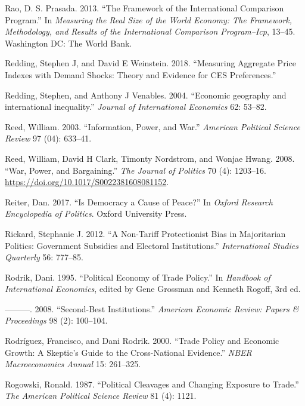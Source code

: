 \documentclass{puthesis}
\newlength{\cslhangindent}
\newenvironment{cslreferences}%
  {\setlength{\parindent}{0pt}%
  \everypar{\setlength{\hangindent}{\cslhangindent}}\ignorespaces}%
  {\par}
\begin{document}
\begin{cslreferences}
\leavevmode\hypertarget{ref-Rao2013}{}%
Rao, D. S. Prasada. 2013. ``The Framework of the International
Comparison Program.'' In \emph{Measuring the Real Size of the World
Economy: The Framework, Methodology, and Results of the International
Comparison Program--Icp}, 13--45. Washington DC: The World Bank.

\leavevmode\hypertarget{ref-Redding2018}{}%
Redding, Stephen J, and David E Weinstein. 2018. ``Measuring Aggregate
Price Indexes with Demand Shocks: Theory and Evidence for CES
Preferences.''

\leavevmode\hypertarget{ref-Redding2004}{}%
Redding, Stephen, and Anthony J Venables. 2004. ``Economic geography and
international inequality.'' \emph{Journal of International Economics}
62: 53--82.

\leavevmode\hypertarget{ref-Reed2003}{}%
Reed, William. 2003. ``Information, Power, and War.'' \emph{American
Political Science Review} 97 (04): 633--41.

\leavevmode\hypertarget{ref-Reed2008}{}%
Reed, William, David H Clark, Timonty Nordstrom, and Wonjae Hwang. 2008.
``War, Power, and Bargaining.'' \emph{The Journal of Politics} 70 (4):
1203--16. \url{https://doi.org/10.1017/S0022381608081152}.

\leavevmode\hypertarget{ref-Reiter2017}{}%
Reiter, Dan. 2017. ``Is Democracy a Cause of Peace?'' In \emph{Oxford
Research Encyclopedia of Politics}. Oxford University Press.

\leavevmode\hypertarget{ref-Rickard2012}{}%
Rickard, Stephanie J. 2012. ``A Non-Tariff Protectionist Bias in
Majoritarian Politics: Government Subsidies and Electoral
Institutions.'' \emph{International Studies Quarterly} 56: 777--85.

\leavevmode\hypertarget{ref-Rodrik1995}{}%
Rodrik, Dani. 1995. ``Political Economy of Trade Policy.'' In
\emph{Handbook of International Economics}, edited by Gene Grossman and
Kenneth Rogoff, 3rd ed.

\leavevmode\hypertarget{ref-Rodrik2008}{}%
---------. 2008. ``Second-Best Institutions.'' \emph{American Economic
Review: Papers \& Proceedings} 98 (2): 100--104.

\leavevmode\hypertarget{ref-Rodriguez2000}{}%
Rodríguez, Francisco, and Dani Rodrik. 2000. ``Trade Policy and Economic
Growth: A Skeptic's Guide to the Cross-National Evidence.'' \emph{NBER
Macroeconomics Annual} 15: 261--325.

\leavevmode\hypertarget{ref-Rogowski1987}{}%
Rogowski, Ronald. 1987. ``Political Cleavages and Changing Exposure to
Trade.'' \emph{The American Political Science Review} 81 (4): 1121.


\end{cslreferences}
\end{document}
